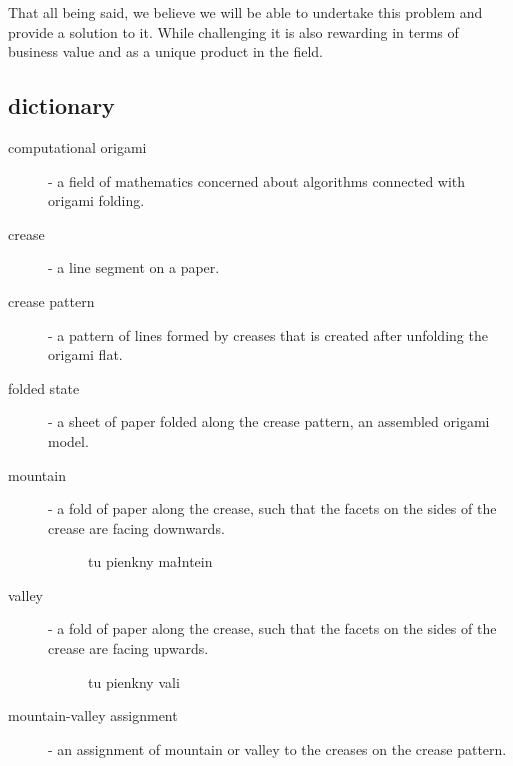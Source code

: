 That all being said, we believe we will be able to undertake this problem and provide a solution to it.
While challenging it is also rewarding in terms of business value and as a unique product in the field.


\subsection{dictionary} \label{dictionary}

\begin{description}
	\item[computational origami] \label{dictionary:computational-origami} - a field of mathematics concerned about algorithms connected with origami folding.
	\item[crease] - a line segment on a paper.
	\item[crease pattern] \label{dictionary:crease-pattern} - a pattern of lines formed by creases that is created after unfolding the origami flat.
	\item[folded state] \label{dictionary:folded-state} - a sheet of paper folded along the crease pattern, an assembled origami model.
	\item[mountain] - a fold of paper along the crease, such that the facets on the sides of the crease are facing downwards.
					\begin{figure}
						tu pienkny małntein
					\end{figure}
	\item[valley] - a fold of paper along the crease, such that the facets on the sides of the crease are facing upwards.
					\begin{figure}
						tu pienkny vali 
					\end{figure}
	\item[mountain-valley assignment] - an assignment of mountain or valley to the creases on the crease pattern.
\end{description}

